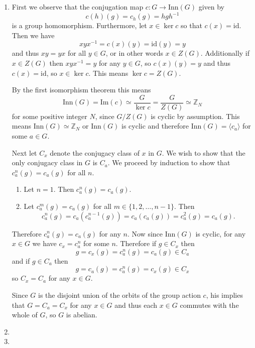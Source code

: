 \documentclass{article}
\begin{document}
\begin{Answer}
\begin{enumerate}
  \item{
    First we observe that the conjugation map 
    $c : G \to \mathrm{Inn}(G)$ given by 
    $$
    c(h)(g) = c_h(g) = h g h^{-1}
    $$
    is a group homomorphism.
    Furthermore, let $x \in \ker c$ so that
    $c(x) = \mathrm{id}$.
    Then we have
    $$
    x y x^{-1} = c(x)(y) = \mathrm{id}(y) = y
    $$
    and thus $x y = y x$ for all $y \in G$, or in other words $x \in
    Z(G)$. Additionally if $x \in Z(G)$ then $xyx^{-1} = y$ for any 
    $y \in G$, so $c(x)(y) = y$ and thus $c(x) = \mathrm{id}$, so
    $x \in \ker c$. This means $\ker c = Z(G)$.

    By the first isomorphism theorem this means
    $$
    \mathrm{Inn}(G) 
  = \mathrm{Im}(c) 
  \simeq \frac{G}{\ker c}
  = \frac{G}{Z(G)}
  \simeq \mathbb{Z}_N
    $$
    for some positive integer $N$, since $G / Z(G)$ is cyclic by
    assumption. This means $\mathrm{Inn}(G) \simeq \mathbb{Z}_N$ or
    $\mathrm{Inn}(G)$ is cyclic and therefore 
    $\mathrm{Inn}(G) = \langle c_a \rangle$ for some $a \in G$.

    Next let $C_x$ denote the conjugacy class of $x$ in $G$.
    We wish to show that the only conjugacy class in $G$
    is $C_a$. We proceed by induction to show that 
    $c_a^n(g) = c_a(g)$ for all $n$.
    \begin{enumerate}
      \item{
        Let $n = 1$. Then $c_a^n(g) = c_a(g)$.
      }
      \item{
        Let $c_a^m(g) = c_a(g)$ for all 
        $m \in \{ 1, 2, \dots, n-1 \}$. Then
        $$
        c_a^n(g) = c_a(c_a^{n-1}(g)) = c_a(c_a(g)) = c_a^2(g) = c_a(g).
        $$
      }        
    \end{enumerate}
    Therefore $c_a^n(g) = c_a(g)$ for any $n$. Now since
    $\mathrm{Inn}(G)$ is cyclic, for any $x \in G$ we have 
    $c_x = c_a^n$ for some $n$. Therefore if $g \in C_x$ then
    $$
    g = c_x(g) = c_a^n(g) = c_a(g) \in C_a
    $$
    and if $g \in C_a$ then
    $$
    g = c_a(g) = c_a^n(g) = c_x(g) \in C_x
    $$
    so $C_x = C_a$ for any $x \in G$.

    Since $G$ is the disjoint union of the orbits of the group action
    $c$, his implies that $G = C_a = C_x$ for any $x \in G$ and thus
    each $x \in G$ commutes with the whole of $G$, so $G$ is abelian.
  }
  \item{}
  \item{}
\end{enumerate}
\end{Answer}
\end{document}
